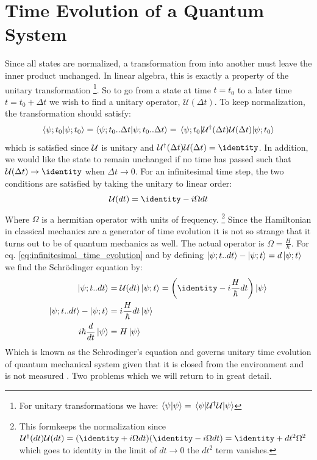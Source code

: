 \section{Time Evolution of a Quantum System}
Since all states are normalized, a transformation from into another must leave the inner product unchanged. In linear algebra, this is exactly a property of the unitary transformation \footnote{For unitary transformations we have: $\braket{\psi}{\psi} = \mel{\psi}{\mathcal{U}^\dagger \mathcal{U}}{\psi}$}. So to go from a state at time $t = t_0$ to a later time $t = t_0 + \Delta t$ we wish to find a unitary operator, $\mathcal{U}(\Delta t)$. To keep normalization, the transformation should satisfy:
\begin{equation}
    \braket{\psi; t_0}{\psi; t_0} = \braket{\psi; t_0 .. \Delta t}{\psi; t_0 .. \Delta t} = \mel{\psi; t_0}{\mathcal{U}^\dagger (\Delta t) \mathcal{U}(\Delta t)}{\psi; t_0} 
\end{equation}
which is satisfied since $\mathcal{U}$ is unitary and $\unitary^\dagger (\Delta t) \unitary(\Delta t) = \identity$. In addition, we would like the state to remain unchanged if no time has passed such that $\unitary(\Delta t) \to \identity$ when $\Delta t \to 0$. For an infinitesimal time step, the two conditions are satisfied by taking the unitary to linear order:
\begin{equation}\label{eq:infinitesimal_time_evolution}
    \unitary(dt) = \identity - i \Omega dt
\end{equation}
Where $\Omega$ is a hermitian operator with units of frequency. \footnote{This formkeeps the normalization since $\unitary^\dagger(dt)\unitary(dt) = (\identity + i \Omega dt)(\identity - i \Omega dt) = \identity + dt^2 \Omega^2$ which goes to identity in the limit of $dt \to 0$ the $dt^2$ term vanishes.}
Since the Hamiltonian in classical mechanics are a generator of time evolution it is not so strange that it turns out to be of quantum mechanics as well. The actual operator is $\Omega = \frac{H}{\hbar}$. For eq. \ref{eq:infinitesimal_time_evolution} and by defining $\ket{\psi; t..dt} - \ket{\psi; t} = d\ket{\psi; t}$ we find the Schrödinger equation by:
\begin{align}
    \ket{\psi; t..dt} &= \unitary(dt) \ket{\psi; t} = \left(\identity - i \frac{H}{\hbar}   dt\right) \ket{\psi} \\
    \ket{\psi; t..dt} - \ket{\psi; t} &= i \frac{H}{\hbar}   dt \ket{\psi} \\
    i \hbar \frac{d}{dt}\ket{\psi} &=  H \ket{\psi}
\end{align}
Which is known as the Schrodinger's equation and governs unitary time evolution of quantum mechanical system given that it is closed from the environment and is not measured \cite{sakurai_modern_2021}. Two problems which we will return to in great detail.

